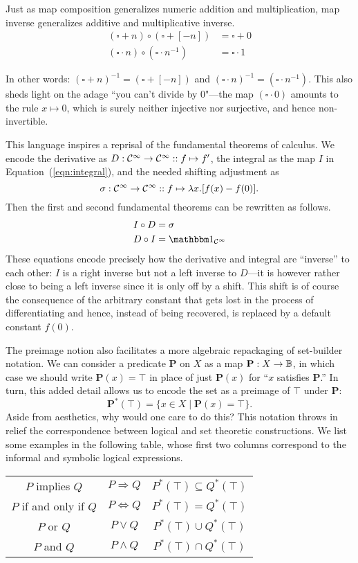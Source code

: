 Just as map composition generalizes numeric addition and multiplication, map inverse generalizes additive and multiplicative inverse.
\begin{align*}
    (\square + n)\circ(\square + [-n]) &= \square + 0 \\
    (\square \cdot n)\circ(\square \cdot n^{-1}) &= \square \cdot 1
\end{align*}

In other words: $(\square +n)^{-1}=(\square + [-n])$ and $(\square\cdot n)^{-1}=(\square\cdot n^{-1})$. This also sheds light on the adage ``you can't divide by 0"---the map $(\square\cdot 0)$ amounts to the rule $x\mapsto 0$, which is surely neither injective nor surjective, and hence non-invertible.

This language inspires a reprisal of the fundamental theorems of calculus. We encode the derivative as $D:\mathcal{C}^\infty \to\mathcal{C}^\infty ::f\mapsto f'$, the integral as the map $I$ in Equation~(\ref{eqn:integral}), and the needed shifting adjustment as
\[\sigma : \mathcal{C}^\infty \to \mathcal{C}^\infty :: f\mapsto \lambda x.[f(x)- f(0)].\]
Then the first and second fundamental theorems can be rewritten as follows.
\begin{align*}
    I\circ D &= \sigma\\
    D\circ I &= \Id{\mcC^\infty}
\end{align*}
These equations encode precisely how the derivative and integral are ``inverse'' to each other: $I$ is a right inverse but not a left inverse to $D$---it is however rather close to being a left inverse since it is only off by a shift. This shift is of course the consequence of the arbitrary constant that gets lost in the process of differentiating and hence, instead of being recovered, is replaced by a default constant $f(0)$.

The preimage notion also facilitates a more algebraic repackaging of set-builder notation. We can consider a predicate $\mathbf{P}$ on $X$ as a map $\mathbf{P}:X\to\mathbb B$, in which case we should write $\mathbf{P}(x)=\top$ in place of just $\mathbf{P}(x)$ for ``$x$ satisfies $\mathbf{P}$.'' In turn, this added detail allows us to encode the set as a preimage of $\top$ under $\mathbf{P}$:
\[\mathbf{P}^*(\top)=\{x\in X\mid \mathbf{P}(x)=\top\}.\]
Aside from aesthetics, why would one care to do this? This notation throws in relief the correspondence between logical and set theoretic constructions. We list some examples in the following table, whose first two columns correspond to the informal and symbolic logical expressions.
\begin{table}[h]
    \centering
    \begin{tabular}{c|c||c}
         $P$ implies $Q$ & $P\Rightarrow Q$ & $P^*(\top)\subseteq Q^*(\top)$  \\
         $P$ if and only if $Q$ & $P\Leftrightarrow Q$ & $P^*(\top)= Q^*(\top)$  \\
         $P$ or $Q$ & $P\vee Q$ & $P^*(\top)\cup Q^*(\top)$ \\
         $P$ and $Q$ & $P\wedge Q$ & $P^*(\top)\cap Q^*(\top)$
    \end{tabular}
    \label{tab:my_label}
\end{table}

